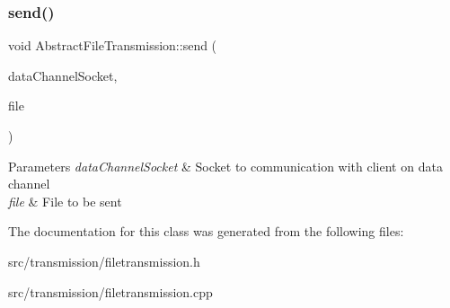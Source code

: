 \subsubsection{\texorpdfstring{send()}{send()}}
{\footnotesize\ttfamily void Abstract\+File\+Transmission\+::send (\begin{DoxyParamCaption}\item[{int}]{data\+Channel\+Socket,  }\item[{const Q\+File \&}]{file }\end{DoxyParamCaption})}


\begin{DoxyParams}{Parameters}
{\em data\+Channel\+Socket} & Socket to communication with client on data channel \\
\hline
{\em file} & File to be sent \\
\hline
\end{DoxyParams}


The documentation for this class was generated from the following files\+:\begin{DoxyCompactItemize}
\item 
src/transmission/filetransmission.\+h\item 
src/transmission/filetransmission.\+cpp\end{DoxyCompactItemize}
